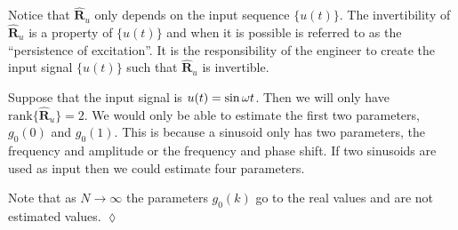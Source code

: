 Notice that $\hat{\mathbf{R}}_u$ only depends on the input sequence $\{u(t)\}$. The invertibility of $\hat{\mathbf{R}}_u$ is a property of $\{u(t)\}$ and when it is possible is referred to as the ``persistence of excitation''. It is the responsibility of the engineer to create the input signal $\{u(t)\}$ such that $\hat{\mathbf{R}}_u$ is invertible.

\begin{example}
Suppose that the input signal is $u(t)=\sin\omega t$. Then we will only have $\text{rank}\{\hat{\mathbf{R}}_u\}=2$. We would only be able to estimate the first two parameters, $g_0(0)$ and $g_0(1)$. This is because a sinusoid only has two parameters, the frequency and amplitude or the frequency and phase shift. If two sinusoids are used as input then we could estimate four parameters.

Note that as $N\to\infty$ the parameters $g_0(k)$ go to the real values and are not estimated values.
$\lozenge$
\end{example}


% 

